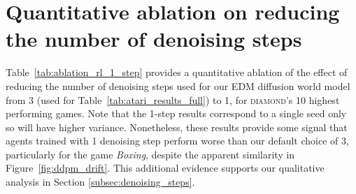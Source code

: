 \section{Quantitative ablation on reducing the number of denoising steps}\label{app:denoising_ablation}

Table~\ref{tab:ablation_rl_1_step} provides a quantitative ablation of the effect of reducing the number of denoising steps used for our EDM diffusion world model from 3 (used for Table~\ref{tab:atari_results_full}) to 1, for \textsc{diamond}'s 10 highest performing games. Note that the 1-step results correspond to a single seed only so will have higher variance. Nonetheless, these results provide some signal that agents trained with 1 denoising step perform worse than our default choice of 3, particularly for the game \textit{Boxing}, despite the apparent similarity in Figure~\ref{fig:ddpm_drift}. This additional evidence supports our qualitative analysis in Section \ref{subsec:denoising_steps}.

